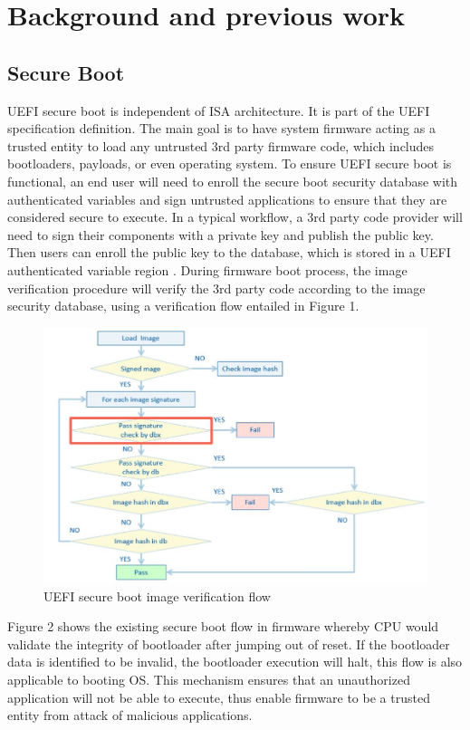 \documentclass[review]{elsarticle}
\begin{document}
\section{ Background and previous work}


\subsection{Secure Boot}
UEFI secure boot is independent of ISA architecture. It is part of the UEFI specification definition. The main goal is to have system firmware acting as a trusted entity to load any untrusted 3rd party firmware code, which includes bootloaders, payloads, or even operating system. To ensure UEFI secure boot is functional, an end user will need to enroll the secure boot security database with authenticated variables and sign untrusted applications to ensure that they are considered secure to execute.
In a typical workflow, a 3rd party code provider will need to sign their components with a private key and publish the public key. Then users can enroll the public key to the database, which is stored in a UEFI authenticated variable region \cite{R5:13}.  During firmware boot process, the image verification procedure will verify the 3rd party code according to the image security database, using a verification flow entailed in Figure 1.


\begin{figure}[H]
	\centering
	\includegraphics[width=1\textwidth]{figs/UefiSecureBootImageVerificationFlow.JPG}
	\caption{UEFI secure boot image verification flow \cite{R5:13}}
\end{figure}

Figure 2 shows the existing secure boot flow in firmware whereby CPU would validate the integrity of bootloader after jumping out of reset. If the bootloader data is identified to be invalid, the bootloader execution will halt, this flow is also applicable to booting OS. This mechanism ensures that an unauthorized application will not be able to execute, thus enable firmware to be a trusted entity from attack of malicious applications. 
\end{document}
